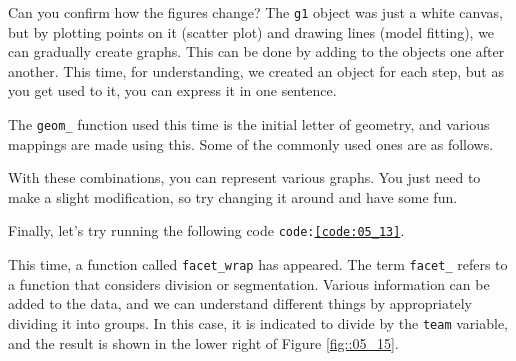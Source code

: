 \documentclass{ltjsbook}
\begin{document}












Can you confirm how the figures change? The \texttt {g1} object was just a white canvas, but by plotting points on it (scatter plot) and drawing lines (model fitting), we can gradually create graphs.
This can be done by adding to the objects one after another. This time, for understanding, we created an object for each step, but as you get used to it, you can express it in one sentence.


The \verb|geom_| function used this time is the initial letter of geometry, and various mappings are made using this. Some of the commonly used ones are as follows.


With these combinations, you can represent various graphs. You just need to make a slight modification, so try changing it around and have some fun.

Finally, let's try running the following code \texttt{code:\ref{code:05_13}}.




This time, a function called \verb|facet_wrap| has appeared. The term \verb|facet_| refers to a function that considers division or segmentation. Various information can be added to the data, and we can understand different things by appropriately dividing it into groups. In this case, it is indicated to divide by the \verb|team| variable, and the result is shown in the lower right of Figure \ref{fig::05_15}.
\end{document}
